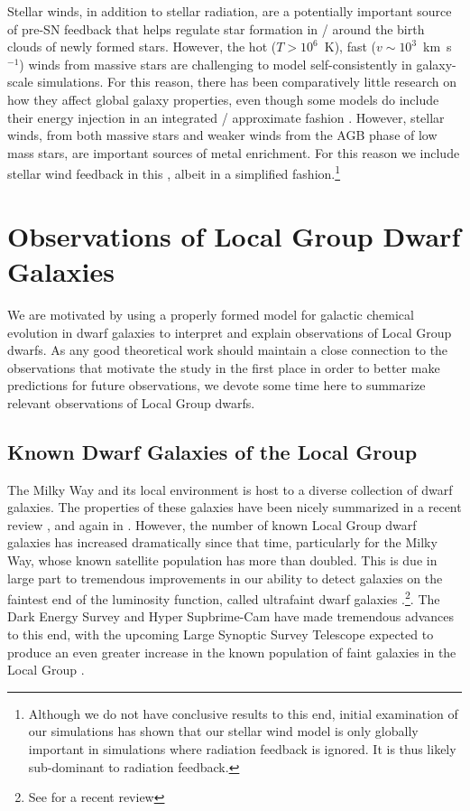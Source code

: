 Stellar winds, in addition to stellar radiation, are a potentially important source of pre-SN feedback that helps regulate star formation in / around the birth clouds of newly formed stars. However, the hot ($T>10^{6}$~K), fast ($v \sim 10^{3}$~km~s$^{-1}$) winds from massive stars \citep{Weaver1977} are challenging to model self-consistently in galaxy-scale simulations. For this reason, there has been comparatively little research on how they affect global galaxy properties, even though some models do include their energy injection in an integrated / approximate fashion \citep[e.g.][]{FIRE}. However, stellar winds, from both massive stars and weaker winds from the AGB phase of low mass stars, are important sources of metal enrichment. For this reason we include stellar wind feedback in this \dissertation, albeit in a simplified fashion.\footnote{Although we do not have conclusive results to this end, initial examination of our simulations has shown that our stellar wind model is only globally important in simulations where radiation feedback is ignored. It is thus likely sub-dominant to radiation feedback.}

\section{Observations of Local Group Dwarf Galaxies}
\label{intro:sec:LG dwarfs}

We are motivated by using a properly formed model for galactic chemical evolution in dwarf galaxies to interpret and explain observations of Local Group dwarfs. As any good theoretical work should maintain a close connection to the observations that motivate the study in the first place in order to better make predictions for future observations, we devote some time here to summarize relevant observations of Local Group dwarfs.

\subsection{Known Dwarf Galaxies of the Local Group}
\label{intro:sec:dwarf galaxies}

The Milky Way and its local environment is host to a diverse collection of dwarf galaxies. The properties of these galaxies have been nicely summarized in a recent review \citep{Tolstoy2009}, and again in \cite{McConnachie2012}. However, the number of known Local Group dwarf galaxies has increased dramatically since that time, particularly for the Milky Way, whose known satellite population has more than doubled. This is due in large part to tremendous improvements in our ability to detect galaxies on the faintest end of the luminosity function, called ultrafaint dwarf galaxies \citep[UFDs][]{Willman2005}.\footnote{See \cite{Simon2019} for a recent review}. The Dark Energy Survey \citep[e.g.][]{Drlica-Wagner2015} and Hyper Supbrime-Cam \citep[e.g.][]{Greco2018} have made tremendous advances to this end, with the upcoming Large Synoptic Survey Telescope expected to produce an even greater increase in the known population of faint galaxies in the Local Group \citep{Haynes2019,Weisz2019}.

